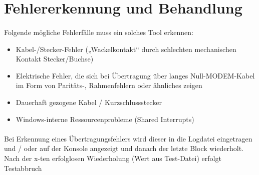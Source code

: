 \section{Fehlererkennung und Behandlung}
\paragraph{}
Folgende mögliche Fehlerfälle muss ein solches Tool erkennen:
\begin{itemize}
\item Kabel-/Stecker-Fehler („Wackelkontakt“ durch schlechten mechanischen Kontakt Stecker/Buchse) 
\item Elektrische Fehler, die sich bei Übertragung über langes Null-MODEM-Kabel im Form von Paritäts-, Rahmenfehlern oder ähnliches zeigen
\item Dauerhaft gezogene Kabel / Kurzschlussstecker
\item Windows-interne Ressourcenprobleme (Shared Interrupts)
\end{itemize} 
\paragraph{}
Bei Erkennung eines Übertragungsfehlers wird dieser in die Logdatei eingetragen und / oder auf der Konsole angezeigt und danach der letzte Block wiederholt. Nach der x-ten erfolglosen Wiederholung (Wert aus Test-Datei) erfolgt Testabbruch

